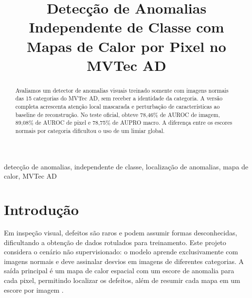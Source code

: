 \documentclass[conference]{IEEEtran}
\begin{document}
\title{Detecção de Anomalias Independente de Classe com Mapas de Calor por Pixel no MVTec AD}

\author{
\and
{}
}

\maketitle

\begin{abstract}
Avaliamos um detector de anomalias visuais treinado somente com imagens normais das 15 categorias do MVTec AD, sem receber a identidade da categoria. A versão completa acrescenta atenção local mascarada e perturbação de características ao baseline de reconstrução. No teste oficial, obteve 78,46\% de AUROC de imagem, 89,08\% de AUROC de pixel e 78,75\% de AUPRO macro. A diferença entre os escores normais por categoria dificultou o uso de um limiar global.
\end{abstract}

\begin{IEEEkeywords}
detecção de anomalias, independente de classe, localização de anomalias, mapa de calor, MVTec AD
\end{IEEEkeywords}

\section{Introdução}
Em inspeção visual, defeitos são raros e podem assumir formas desconhecidas, dificultando a obtenção de dados rotulados para treinamento. Este projeto considera o cenário não supervisionado: o modelo aprende exclusivamente com imagens normais e deve assinalar desvios em imagens de diferentes categorias. A saída principal é um mapa de calor espacial com um escore de anomalia para cada pixel, permitindo localizar os defeitos, além de resumir cada mapa em um escore por imagem \cite{bergmann2021mvtec}.
\end{document}
